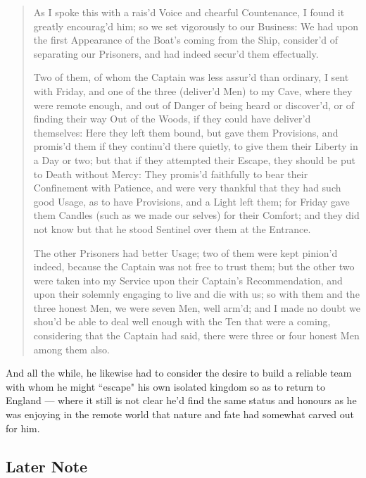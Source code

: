 \documentclass[a4paper]{article}
\begin{document}
\noindent
\begin{minipage}{1\textwidth}
\vspace{1em}
\begin{quotation}
{\ttfamily


As I spoke this with a rais’d Voice and chearful Countenance, I found it greatly encourag’d him; so we set vigorously to our Business: We had upon the first Appearance of the Boat’s coming from the Ship, consider’d of separating our Prisoners, and had indeed secur’d them effectually.

Two of them, of whom the Captain was less assur’d than ordinary, I sent with Friday, and one of the three (deliver’d Men) to my Cave, where they were remote enough, and out of Danger of being heard or discover’d, or of finding their way Out of the Woods, if they could have deliver’d themselves: Here they left them bound, but gave them Provisions, and promis’d them if they continu’d there quietly, to give them their Liberty in a Day or two; but that if they attempted their Escape, they should be put to Death without Mercy: They promis’d faithfully to bear their Confinement with Patience, and were very thankful that they had such good Usage, as to have Provisions, and a Light left them; for Friday gave them Candles (such as we made our selves) for their Comfort; and they did not know but that he stood Sentinel over them at the Entrance.

The other Prisoners had better Usage; two of them were kept pinion’d indeed, because the Captain was not free to trust them; but the other two were taken into my Service upon their Captain’s Recommendation, and upon their solemnly engaging to live and die with us; so with them and the three honest Men, we were seven Men, well arm’d; and I made no doubt we shou’d be able to deal well enough with the Ten that were a coming, considering that the Captain had said, there were three or four honest Men among them also.


}
\end{quotation}
\vspace{1em}
\end{minipage}


And all the while, he likewise had to consider the desire to build a reliable team with whom he might ``escape" his own isolated kingdom so as to return to England --- where it still is not clear he'd find the same status and honours as he was enjoying in the remote world that nature and fate had somewhat carved out for him.


\subsection{Later Note}
\end{document}
